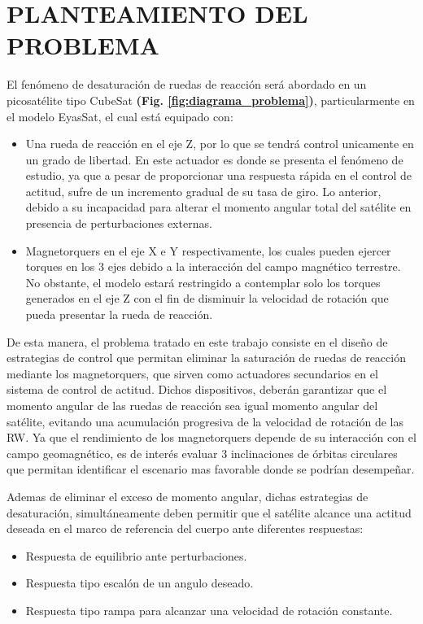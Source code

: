 \section{PLANTEAMIENTO DEL PROBLEMA}


El fenómeno de desaturación de ruedas de reacción será abordado en un picosatélite tipo CubeSat \textbf{(Fig. \ref{fig:diagrama_problema})}, particularmente en el modelo EyasSat, el cual está equipado con:

\begin{itemize}

\item Una rueda de reacción en el eje Z, por lo que se tendrá control unicamente en un grado de libertad. En este actuador es donde se presenta el fenómeno de estudio, ya que a pesar de proporcionar una respuesta rápida en el control de actitud, sufre de un incremento gradual de su tasa de giro. Lo anterior, debido a su incapacidad para alterar el momento angular total del satélite en presencia de perturbaciones externas. 
 
\item Magnetorquers en el eje X e Y respectivamente, los cuales pueden ejercer torques en los 3 ejes debido a la interacción del campo magnético terrestre. No obstante, el modelo estará restringido a contemplar solo los torques generados en el eje Z con el fin de disminuir la velocidad de rotación que pueda presentar la rueda de reacción. 

\end{itemize}

De esta manera, el problema tratado en este trabajo consiste en el diseño de estrategias de control que permitan eliminar la saturación de ruedas de reacción mediante los magnetorquers, que sirven como actuadores secundarios en el sistema de control de actitud. Dichos dispositivos, deberán garantizar que el momento angular de las ruedas de reacción sea igual momento angular del satélite, evitando una acumulación progresiva de la velocidad de rotación de las RW.
Ya que el rendimiento de los magnetorquers depende de su interacción con el campo geomagnético, es de interés evaluar 3 inclinaciones de órbitas circulares que permitan identificar el escenario mas favorable donde se podrían desempeñar.

Ademas de eliminar el exceso de momento angular, dichas estrategias de desaturación, simultáneamente deben permitir que el satélite alcance una actitud deseada en el marco de referencia del cuerpo ante diferentes respuestas:
\begin{itemize}
	\item Respuesta de equilibrio ante perturbaciones. 
	\item Respuesta tipo escalón de un angulo deseado.
	\item Respuesta tipo rampa para alcanzar una velocidad de rotación constante.
\end{itemize} 
 


